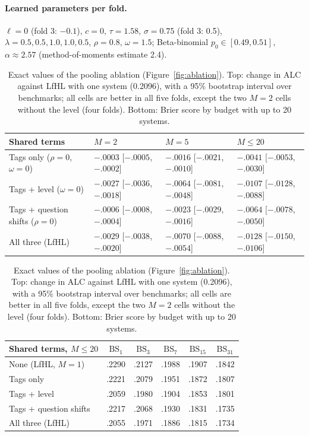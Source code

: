 \documentclass{article}
\newcommand{\lfhl}{LfHL}
\begin{document}
\paragraph{Learned parameters per fold.} $\ell = 0$ (fold 3: $-0.1$), $c = 0$, $\tau = 1.58$, $\sigma = 0.75$ (fold 3: 0.5), $\lambda = 0.5, 0.5, 1.0, 1.0, 0.5$, $\rho = 0.8$, $\omega = 1.5$; Beta-binomial $p_0 \in [0.49, 0.51]$, $\alpha \approx 2.57$ (method-of-moments estimate 2.4).

\begin{table}[h]
  \caption{Exact values of the pooling ablation (Figure~\ref{fig:ablation}). Top: change in ALC against \lfhl{} with one system (0.2096), with a 95\% bootstrap interval over benchmarks; all cells are better in all five folds, except the two $M=2$ cells without the level (four folds). Bottom: Brier score by budget with up to 20 systems.}
  \label{tab:ablation}
  \centering
  \footnotesize
  \setlength{\tabcolsep}{4pt}
  \begin{tabular}{@{}llll@{}}
    \toprule
    Shared terms & $M=2$ & $M=5$ & $M\le 20$ \\
    \midrule
    Tags only ($\rho=0$, $\omega=0$) & $-.0003$ [$-.0005$, $-.0002$] & $-.0016$ [$-.0021$, $-.0010$] & $-.0041$ [$-.0053$, $-.0030$] \\
    Tags + level ($\omega=0$) & $-.0027$ [$-.0036$, $-.0018$] & $-.0064$ [$-.0081$, $-.0048$] & $-.0107$ [$-.0128$, $-.0088$] \\
    Tags + question shifts ($\rho=0$) & $-.0006$ [$-.0008$, $-.0004$] & $-.0023$ [$-.0029$, $-.0016$] & $-.0064$ [$-.0078$, $-.0050$] \\
    All three (\lfhl) & $-.0029$ [$-.0038$, $-.0020$] & $-.0070$ [$-.0088$, $-.0054$] & $-.0128$ [$-.0150$, $-.0106$] \\
    \bottomrule
  \end{tabular}

  \vspace{6pt}
  \begin{tabular}{@{}lccccc@{}}
    \toprule
    Shared terms, $M \le 20$ & $\mathrm{BS}_1$ & $\mathrm{BS}_3$ & $\mathrm{BS}_7$ & $\mathrm{BS}_{15}$ & $\mathrm{BS}_{31}$ \\
    \midrule
    None (\lfhl, $M=1$) & .2290 & .2127 & .1988 & .1907 & .1842 \\
    Tags only & .2221 & .2079 & .1951 & .1872 & .1807 \\
    Tags + level & .2059 & .1980 & .1904 & .1853 & .1801 \\
    Tags + question shifts & .2217 & .2068 & .1930 & .1831 & .1735 \\
    All three (\lfhl) & .2055 & .1971 & .1886 & .1815 & .1734 \\
    \bottomrule
  \end{tabular}
\end{table}
\end{document}
